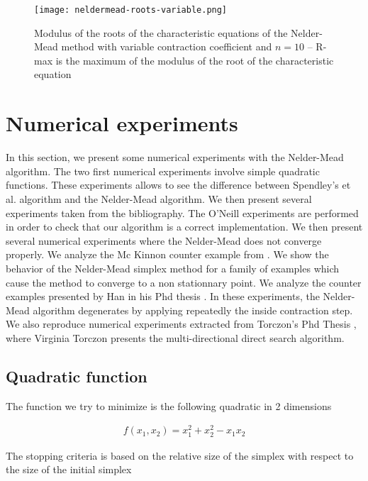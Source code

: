 \begin{figure}
\begin{center}
\texttt{[image: neldermead-roots-variable.png]}
\end{center}
\caption{Modulus of the roots of the characteristic equations of the Nelder-Mead method with variable 
contraction coefficient and $n=10$ -- R-max is the maximum of the modulus of the root of the 
characteristic equation}
\label{fig-nm-roots-variable}
\end{figure}

\section{Numerical experiments}

In this section, we present some numerical experiments 
with the Nelder-Mead algorithm.
The two first numerical experiments involve simple quadratic functions.
These experiments allows to see the difference between
Spendley's et al. algorithm and the Nelder-Mead algorithm.
We then present several experiments taken from the bibliography.
The O'Neill experiments \cite{O'Neill1971AAF} are performed in order 
to check that our algorithm is a correct implementation.
We then present several numerical experiments where the Nelder-Mead
does not converge properly.
We analyze the Mc Kinnon counter example 
from \cite{589109}. We show the behavior of the 
Nelder-Mead simplex method for a family of examples which cause the 
method to converge to a non stationnary point.
We analyze the counter examples presented by Han in his Phd thesis \cite{Han2000}.
In these experiments, the Nelder-Mead algorithm degenerates by applying repeatedly
the inside contraction step.
We also reproduce numerical experiments extracted from Torczon's Phd Thesis 
\cite{Torczon89multi-directionalsearch}, where Virginia Torczon 
presents the multi-directional direct search algorithm. 

\subsection{Quadratic function}

The function we try to minimize is the following quadratic 
in 2 dimensions 

\begin{eqnarray}
f(x_1,x_2) = x_1^2 + x_2^2 - x_1 x_2
\end{eqnarray}

The stopping criteria is based on the relative size of the simplex 
with respect to the size of the initial simplex 

